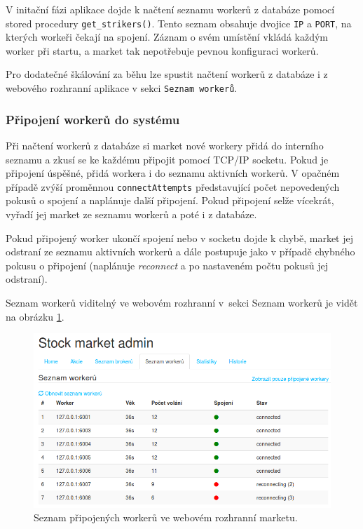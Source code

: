 \documentclass[thesis=M,czech]{FITthesis}[2012/06/26]
\begin{document}
	V initační fázi aplikace dojde k načtení seznamu workerů z databáze pomocí stored procedury \texttt{get\_strikers()}. Tento seznam obsahuje dvojice \texttt{IP} a \texttt{PORT}, na kterých workeři čekají na spojení. Záznam o svém umístění vkládá každým worker při startu, a market tak nepotřebuje pevnou konfiguraci workerů.
	
	Pro dodatečné škálování za běhu lze spustit načtení workerů z databáze i z webového rozhranní aplikace v sekci \texttt{Seznam workerů}.
		
			
\subsubsection{Připojení workerů do systému}
	
	Při načtení workerů z databáze si market nové workery přidá do interního seznamu a zkusí se ke každému připojit pomocí TCP/IP socketu. Pokud je připojení úspěšné, přidá workera i do seznamu aktivních workerů. V opačném případě zvýší proměnnou \texttt{connectAttempts} představující počet nepovedených pokusů o spojení a naplánuje další připojení. Pokud připojení selže vícekrát, vyřadí jej market ze seznamu workerů a poté i z databáze.
	
	Pokud připojený worker ukončí spojení nebo v socketu dojde k chybě, market jej odstraní ze seznamu aktivních workerů a dále postupuje jako v případě chybného pokusu o připojení (naplánuje \textit{reconnect} a po nastaveném počtu pokusů jej odstraní).
	
	Seznam workerů viditelný ve webovém rozhranní v~sekci Seznam workerů je vidět na obrázku \ref{fig:worker_list}.
	
\begin{figure}[h]
	\centering
	\includegraphics[width=1\textwidth]{images/strikers}
 	\caption[Seznam připojených workerů ve webovém rozhranní marketu]{Seznam připojených workerů ve webovém rozhranní marketu.}
 	\label{fig:worker_list} 	
\end{figure}
	
\end{document}
